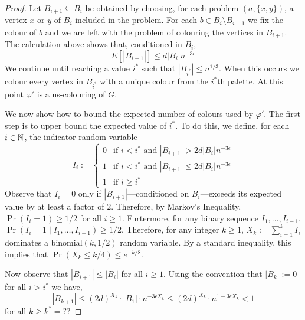 \documentclass[kpfonts]{patmorin}
\begin{document}
\begin{proof}
  Let $B_{i+1}\subseteq B_i$ be obtained by choosing, for each problem $(a,\{x,y\})$, a vertex $x$ or $y$ of $B_i$ included in the problem.  For each $b\in B_i\setminus B_{i+1}$ we fix the colour of $b$ and we are left with the problem of colouring the vertices in $B_{i+1}$.  The calculation above shows that, conditioned in $B_i$,
  \[
    E[|B_{i+1}|] \le d|B_i|n^{-3\epsilon}
  \]
  We continue until reaching a value $i^*$ such that $|B_{i^*}|\le n^{1/3}$.  When this occurs we colour every vertex in $B_{i^*}$ with a unique colour from the $i^*$th palette.  At this point $\varphi'$ is a us-colouring of $G$.

  We now show how to bound the expected number of colours used by $\varphi'$.  The first step is to upper bound the expected value of $i^*$.  To do this, we define, for each $i\in\mathbb{N}$, the indicator random variable
  \[
      I_i :=
        \begin{cases}
          0 & \text{if $i<i^*$ and $|B_{i+1}|> 2d|B_i|n^{-3\epsilon}$} \\
          1 & \text{if $i< i^*$ and $|B_{i+1}|\le 2d|B_i|n^{-3\epsilon}$} \\
          1 & \text{if $i\ge i^*$}
        \end{cases}
  \]
  Observe that $I_i=0$ only if $|B_{i+1}|$---conditioned on $B_i$---exceeds its expected value by at least a factor of $2$. Therefore, by Markov's Inequality, $\Pr(I_i=1)\ge 1/2$ for all $i\ge 1$.  Furtermore, for any binary sequence $I_{1},\ldots,I_{i-1}$, $\Pr(I_i=1\mid I_1,\ldots,I_{i-1})\ge 1/2$.  Therefore, for any integer $k\ge 1$, $X_k:=\sum_{i=1}^k I_i$ dominates a binomial$(k,1/2)$ random variable.  By a standard inequality, this implies that $\Pr(X_k\le k/4)\le e^{-k/8}$.

  Now observe that $|B_{i+1}|\le |B_i|$ for all $i\ge 1$. Using the convention that $|B_k|:=0$ for all $i>i^*$ we have,
  \[
    |B_{k+1}| \le (2d)^{X_k}\cdot |B_1|\cdot n^{-3\epsilon X_k} \le (2d)^{X_k}\cdot n^{1-3\epsilon X_k} < 1
  \]
  for all $k\ge k^* = ??$


\end{proof}
\end{document}
